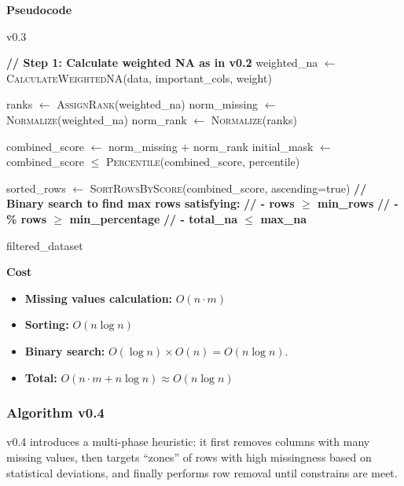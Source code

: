 \documentclass[a4paper,12pt]{article}
\begin{document}
\textbf{Pseudocode}
\begin{algorithm}[H]
\caption{v0.3}
\begin{algorithmic}[1]
    \State \textbf{// Step 1: Calculate weighted NA as in v0.2}
    \State weighted\_na $\gets$ \textsc{CalculateWeightedNA}(data, important\_cols, weight)
    
    \State ranks $\gets$ \textsc{AssignRank}(weighted\_na) 
    \State norm\_missing $\gets$ \textsc{Normalize}(weighted\_na) 
    \State norm\_rank $\gets$ \textsc{Normalize}(ranks) 
    
    \State combined\_score $\gets$ norm\_missing $+$ norm\_rank
    \State initial\_mask $\gets$ combined\_score $\leq$ \textsc{Percentile}(combined\_score, percentile)
    
        \State sorted\_rows $\gets$ \textsc{SortRowsByScore}(combined\_score, ascending=true)
        \State \textbf{// Binary search to find max rows satisfying:}
        \State \textbf{// - rows $\geq$ min\_rows}
        \State \textbf{// - \% rows $\geq$ min\_percentage}
        \State \textbf{// - total\_na $\leq$ max\_na}
    \EndIf
    
    \State \Return filtered\_dataset
\EndFunction
\end{algorithmic}
\end{algorithm}

\textbf{Cost}
\begin{itemize}
    \item \textbf{Missing values calculation:} $O(n \cdot m)$
    \item \textbf{Sorting:} $O(n \log n)$
    \item \textbf{Binary search:} $O(\log n) \times O(n) = O(n \log n)$.
    \item \textbf{Total:} $O(n \cdot m + n \log n) \approx O(n \log n)$
\end{itemize}


\subsubsection{Algorithm v0.4}
v0.4 introduces a multi-phase heuristic: it first removes columns with many missing values, then targets “zones” of rows with high missingness based on statistical deviations, and finally performs row removal until constrains are meet.
\end{document}

